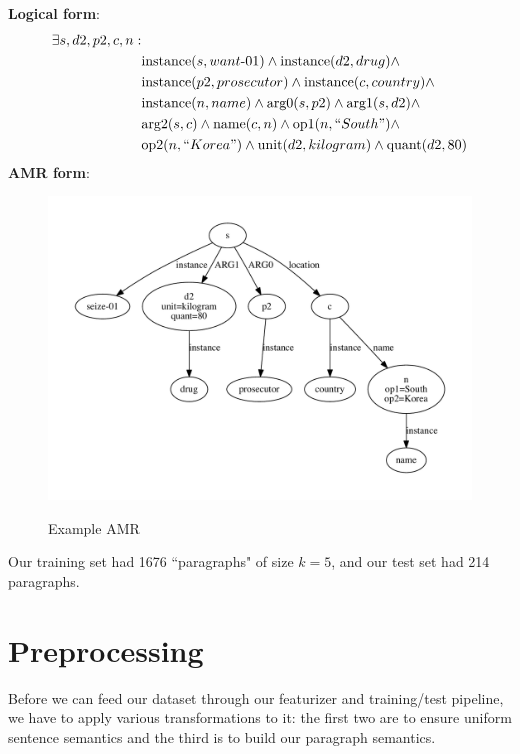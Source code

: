 \documentclass[12pt]{article}
\begin{document}
\noindent \textbf{Logical form}:
\begin{equation}
\begin{split}
\exists s,d2,p2,c,n: &\\
&\text{instance}(s,want\text{-}01) \wedge \text{instance}(d2, drug) \wedge \\
&\text{instance}(p2, prosecutor) \wedge \text{instance}(c, country) \wedge \\
&\text{instance}(n, name) \wedge \text{arg0}(s,p2) \wedge \text{arg1}(s,d2)
\wedge \\ &\text{arg2}(s,c) \wedge \text{name}(c,n) \wedge \text{op1}(n,
``South") \wedge \\ &\text{op2}(n, ``Korea") \wedge \text{unit}(d2, kilogram)
\wedge \text{quant}(d2, 80)
\end{split}
\end{equation}
\textbf{AMR form}:
\begin{figure}
\includegraphics[width=\linewidth]{amr_example.pdf}
\label{fig:amr_example}
\caption{Example AMR}
\end{figure}

Our training set had 1676 ``paragraphs" of size $k=5$, and our test set had 214
paragraphs.

\section{Preprocessing}
Before we can feed our dataset through our featurizer and training/test pipeline, we have to apply various transformations to it: the first two are to ensure uniform sentence semantics and the third is to build our paragraph semantics.
\end{document}
